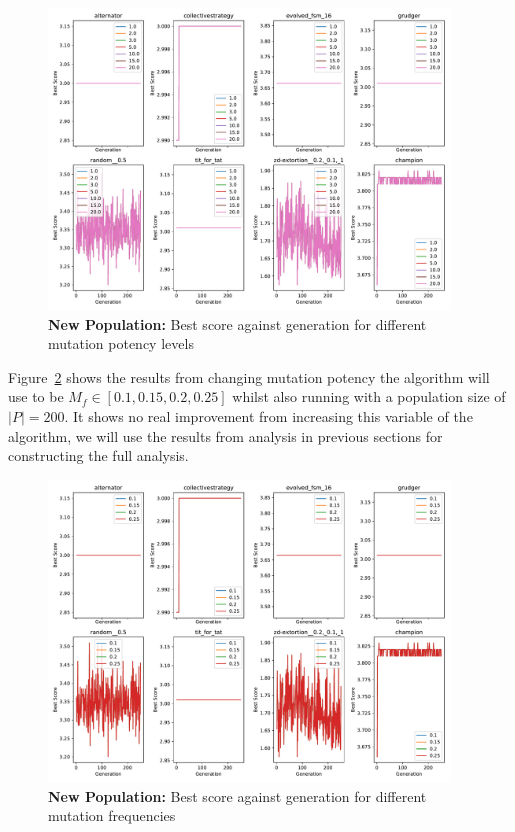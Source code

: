 \begin{figure}[ht]
    \includegraphics[width=0.95\textwidth, keepaspectratio, center]{./img/plots/NEW_MUT_POT_bs_v_gen_all.pdf}
    \caption{\textbf{New Population:} Best score against generation for different mutation potency levels}\label{fig:NEW-MUT-POT-bs-v-gen-all}
\end{figure}

Figure~\ref{fig:NEW-MUT-FREQ-bs-gen-all} shows the results from changing mutation potency the algorithm will use to be \(M_f \in [0.1,0.15,0.2,0.25] \) whilst also running with a population size of \(|P|=200\).
It shows no real improvement from increasing this variable of the algorithm, we will use the results from analysis in previous sections for constructing the full analysis.

\begin{figure}[ht]
    \includegraphics[width=0.95\textwidth, keepaspectratio, center]{./img/plots/NEW_MUT_FREQ_bs_v_gen_all.pdf}
    \caption{\textbf{New Population:} Best score against generation for different mutation frequencies}\label{fig:NEW-MUT-FREQ-bs-gen-all}
\end{figure}

